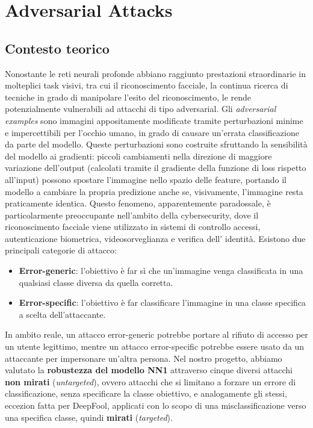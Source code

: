\chapter{Adversarial Attacks}
    \section{Contesto teorico}
        Nonostante le reti neurali profonde abbiano raggiunto prestazioni straordinarie in molteplici task visivi, tra cui il riconoscimento facciale, la continua ricerca di tecniche in grado di manipolare l'esito del riconoscimento, le rende potenzialmente vulnerabili ad attacchi di tipo adversarial.
        Gli \textit{adversarial examples} sono immagini appositamente modificate tramite perturbazioni minime e impercettibili per l’occhio umano, in grado di causare un’errata classificazione da parte del modello. Queste perturbazioni sono costruite sfruttando la sensibilità del modello ai gradienti: piccoli cambiamenti nella direzione di maggiore variazione dell’output (calcolati tramite il gradiente della funzione di loss rispetto all’input) possono spostare l’immagine nello spazio delle feature, portando il modello a cambiare la propria predizione anche se, visivamente, l’immagine resta praticamente identica. 
        Questo fenomeno, apparentemente paradossale, è particolarmente preoccupante nell'ambito della cybersecurity, dove il riconoscimento facciale viene utilizzato in sistemi di controllo accessi, autenticazione biometrica, videosorveglianza e verifica dell' identità.
        Esistono due principali categorie di attacco:
            \begin{itemize}
                \item \textbf{Error-generic}: l'obiettivo è far sì che un'immagine venga classificata in una qualsiasi classe diversa da quella corretta.
                
                \item \textbf{Error-specific}: l'obiettivo è far classificare l'immagine in una classe specifica a scelta dell'attaccante.
            \end{itemize}

        \noindent In ambito reale, un attacco error-generic potrebbe portare al rifiuto di accesso per un utente legittimo, mentre un attacco error-specific potrebbe essere usato da un attaccante per impersonare un’altra persona.
        Nel nostro progetto, abbiamo valutato la \textbf{robustezza del modello NN1} attraverso cinque diversi attacchi \textbf{non mirati} (\textit{untargeted}), ovvero attacchi che si limitano a forzare un errore di classificazione, senza specificare la classe obiettivo, e analogamente gli stessi, eccezion fatta per DeepFool, applicati con lo scopo di una misclassificazione verso una specifica classe, quindi \textbf{mirati} (\textit{targeted}).

